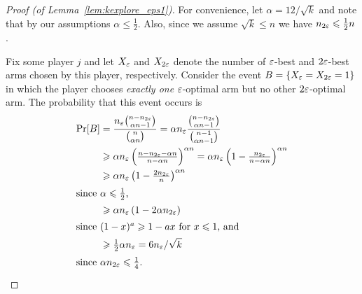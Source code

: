 \documentclass{article}
\begin{document}
\begin{proof}[Proof (of Lemma~\ref{lem:kexplore_eps1})]
For convenience, let $\alpha = 12/\sqrt{k}$ and note that by our assumptions $\alpha \le \tfrac{1}{2}$.
Also, since we assume $\sqrt{k} \le n$ we have $n_{2\varepsilon} \leqslant \tfrac{1}{2}n$.

Fix some player $j$ and let $X_{\varepsilon}$ and $X_{2\varepsilon}$ denote the number of $\varepsilon$-best and $2\varepsilon$-best arms chosen by this player, respectively. 
Consider the event $B = \{X_{\varepsilon} = X_{2\varepsilon} = 1\}$ in which the player chooses \emph{exactly one} $\varepsilon$-optimal arm but no other $2\varepsilon$-optimal arm.
The probability that this event occurs is
\begin{align*}
	\Pr[B]
	&= \frac{n_{\varepsilon} {n - n_{2\varepsilon} \choose \alpha n - 1}}
		{{n \choose \alpha n}}
	= \alpha n_{\varepsilon} \frac{{n - n_{2\varepsilon} \choose \alpha n - 1}}
		{{n-1 \choose \alpha n - 1}} \\
	&\geqslant \alpha n_{\varepsilon} \left( \tfrac{n - n_{2\varepsilon} - \alpha n}{n-\alpha n} \right)^{\alpha n}
	= \alpha n_{\varepsilon} \left( 1 - \tfrac{n_{2\varepsilon}}{n-\alpha n} \right)^{\alpha n} \\
	&\geqslant \alpha n_{\varepsilon} \left( 1 - \tfrac{2 n_{2\varepsilon}}{n} \right)^{\alpha n} \\
	\intertext{since $\alpha \leqslant \tfrac{1}{2}$,}
	&\geqslant \alpha n_{\varepsilon} \left( 1- 2 \alpha n_{2\varepsilon} \right) \\
	\intertext{since $(1-x)^a \geqslant 1-ax$ for $x \leqslant 1$, and}
	&\geqslant \tfrac{1}{2}\alpha n_{\varepsilon} = 6 n_{\varepsilon}/\sqrt{k} \\
	\intertext{since $\alpha n_{2\varepsilon} \leqslant \frac{1}{4}$.}
\end{align*}


\end{proof}
\end{document}
